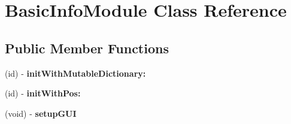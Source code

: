 \hypertarget{interface_basic_info_module}{
\section{\-Basic\-Info\-Module \-Class \-Reference}
\label{interface_basic_info_module}
}
\subsection*{\-Public \-Member \-Functions}
\begin{DoxyCompactItemize}
\item 
\hypertarget{interface_basic_info_module_a4efdb39ebac768038e2413855d47f96e}{
(id) -\/ {\bfseries init\-With\-Mutable\-Dictionary\-:}}
\label{interface_basic_info_module_a4efdb39ebac768038e2413855d47f96e}

\item 
\hypertarget{interface_basic_info_module_a530aae8c98597a2a5e154f7c4fc1f281}{
(id) -\/ {\bfseries init\-With\-Pos\-:}}
\label{interface_basic_info_module_a530aae8c98597a2a5e154f7c4fc1f281}

\item 
\hypertarget{interface_basic_info_module_a9daa182a5f212f5ba5de9f215c0fcd27}{
(void) -\/ {\bfseries setup\-G\-U\-I}}
\label{interface_basic_info_module_a9daa182a5f212f5ba5de9f215c0fcd27}

\end{DoxyCompactItemize}

